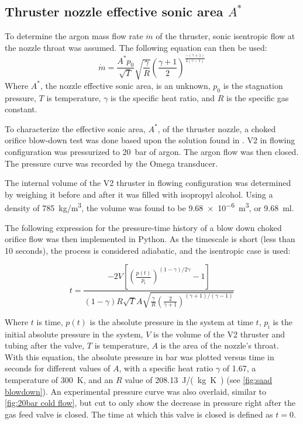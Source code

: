         \subsection{Thruster nozzle effective sonic area $A^*$}

            To determine the argon mass flow rate $\dot{m}$ of the thruster, sonic isentropic flow at the nozzle throat was assumed. The following equation can then be used:
            \begin{equation}
                \dot{m} = \frac{A^* p_0}{\sqrt{T}}\sqrt{\frac{\gamma}{R}}\left(\frac{\gamma + 1}{2}\right)^{\frac{-(\gamma + 1)}{2(\gamma-1)}}
                \label{eqn:massflow}
            \end{equation}
            Where $A^*$, the nozzle effective sonic area, is an unknown, $p_0$ is the stagnation pressure, $T$ is temperature, $\gamma$ is the specific heat ratio, and $R$ is the specific gas constant.
        
            To characterize the effective sonic area, $A^*$, of the thruster nozzle, a choked orifice blow-down test was done based upon the solution found in \textcite{saadCompressibleFluidFlow}. V2 in flowing configuration was pressurized to \qty{20}{bar} of argon. The argon flow was then closed. The pressure curve was recorded by the Omega transducer.

            The internal volume of the V2 thruster in flowing configuration was determined by weighing it before and after it was filled with isopropyl alcohol. Using a density of \qty{785}{kg/m^3}, the volume was found to be \qty{9.68e-6}{m^3}, or \qty{9.68}{ml}.

            The following expression for the pressure-time history of a blow down choked orifice flow \cite{saadCompressibleFluidFlow} was then implemented in Python. As the timescale is short (less than 10 seconds), the process is considered adiabatic, and the isentropic case is used:

            \begin{equation}
                t =  \frac{-2V \left[\left(\frac{p(t)}{p_\mathrm{i}}\right)^{(1-\gamma) / 2\gamma} -1 \right]}{(1-\gamma) R \sqrt{T} A \sqrt{\frac{\gamma}{R}\left(\frac{2}{\gamma + 1}\right)^{(\gamma+1) / (\gamma-1)}}}
            \end{equation}

            Where $t$ is time, $p(t)$ is the absolute pressure in the system at time $t$, $p_\mathrm{i}$ is the initial absolute pressure in the system, $V$ is the volume of the V2 thruster and tubing after the valve, $T$ is temperature, $A$ is the area of the nozzle's throat. With this equation, the absolute pressure in bar was plotted versus time in seconds for different values of $A$, with a specific heat ratio $\gamma$ of 1.67, a temperature of \qty{300}{K}, and an $R$ value of \qty{208.13}{J/(kg.K)} (see \autoref{fig:saad blowdown}). An experimental pressure curve was also overlaid, similar to \autoref{fig:20bar cold flow}, but cut to only show the decrease in pressure right after the gas feed valve is closed. The time at which this valve is closed is defined as $t=0$.

